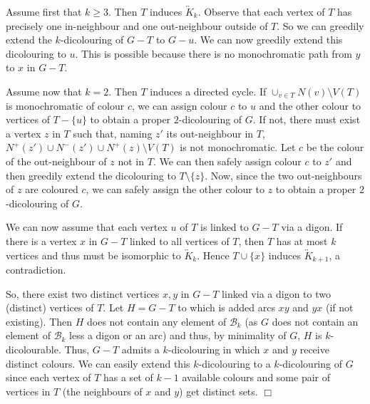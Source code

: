 \documentclass[11pt]{article}
\newcommand{\mc}{\mathcal}
\newcommand{\olra}{\overleftrightarrow}
\newcounter{claim}
\newenvironment{proof}[1][]%
 {\noindent {\setcounter{claim}{0}\sc proof ---
   }{#1}{}}{\hfill$\Box$\vspace{2ex}}
\begin{document}
\begin{proof}
Assume first that $k \geq 3$. Then $T$ induces $\olra K_{k}$. 
Observe that each vertex of $T$ has precisely one in-neighbour and one out-neighbour outside of $T$. So we can greedily extend the $k$-dicolouring of $G-T$ to $G-u$. We can now greedily extend this dicolouring to $u$. This is possible because there is no monochromatic path from $y$ to $x$ in $G-T$. 


Assume now that $k=2$. Then $T$ induces a directed cycle. 
If $\cup_{v \in T} N(v) \setminus V(T)$  is monochromatic of colour $c$, we can assign colour $c$ to $u$ and the other colour to vertices of $T-\{u\}$ to obtain a proper $2$-dicolouring of $G$. If not,  there must exist a vertex $z$ in $T$ such that, naming $z'$ its out-neighbour in $T$, $N^{+}(z') \cup N^{-}(z') \cup N^{+}(z) \setminus V(T)$ is not monochromatic. Let $c$ be the colour of the out-neighbour of $z$ not in $T$. We can then safely assign colour $c$ to $z'$ and then greedily extend the dicolouring to $T \setminus \{z\}$.  Now, since the two out-neighbours of $z$ are coloured $c$, we can safely assign the other colour to $z$ to obtain a proper $2$-dicolouring of $G$. 
\medskip


We can now assume that each vertex $u$ of $T$ is linked to $G - T$ via a digon. 
If there is a vertex $x$ in $G-T$ linked to all vertices of $T$, then $T$ has at most $k$ vertices and thus must be isomorphic to $\olra K_{k}$. Hence $T \cup \{x\}$ induces $\olra K_{k+1}$, a contradiction. 

So, there exist two distinct vertices $x,y$ in $G-T$ linked via a digon to two (distinct) vertices of $T$. 
Let $H = G - T$ to which is added arcs $xy$ and $yx$ (if not existing). Then $H$ does not contain any element of $\mathcal B_{k}$ (as $G$ does not contain an element of $\mc B_{k}$ less a digon or an arc) and thus, by minimality of $G$, $H$ is $k$-dicolourable. 
Thus, $G - T$ admits a $k$-dicolouring in which $x$ and $y$ receive distinct colours. We can easily extend this $k$-dicolouring to a $k$-dicolouring of $G$ since each vertex of $T$ has a set of $k-1$ available colours and some pair  of vertices  in $T$ (the neighbours of $x$ and $y$) get distinct sets.
\end{proof}
\end{document}
